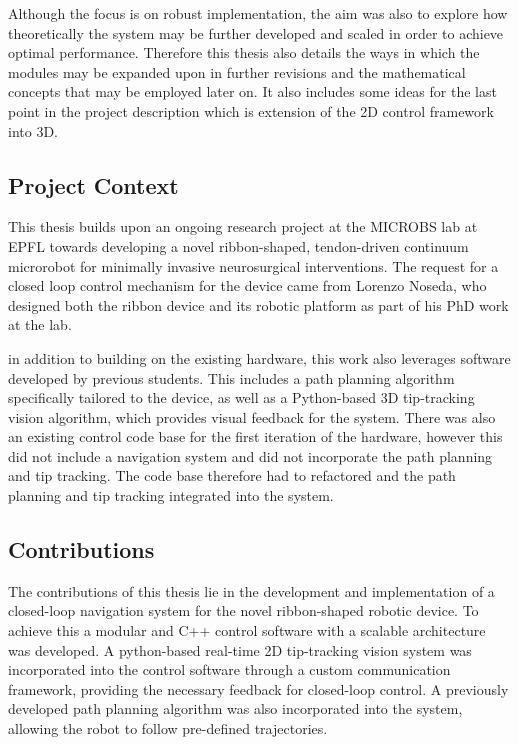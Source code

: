 Although the focus is on robust implementation, the aim was also to explore how theoretically the system may be further developed and scaled in order to achieve optimal performance. Therefore this thesis also details the ways in which the modules may be expanded upon in further revisions and the mathematical concepts that may be employed later on. It also includes some ideas for the last point in the project description which is extension of the 2D control framework into 3D.

\subsection{Project Context}

This thesis builds upon an ongoing research project at the MICROBS lab at EPFL towards developing a novel ribbon-shaped, tendon-driven continuum microrobot for minimally invasive neurosurgical interventions. The request for a closed loop control mechanism for the device came from Lorenzo Noseda, who designed both the ribbon device and its robotic platform as part of his PhD work at the lab. 

in addition to building on the existing hardware, this work also leverages software developed by previous students. This includes a path planning algorithm specifically tailored to the device, as well as a Python-based 3D tip-tracking vision algorithm, which provides visual feedback for the system. There was also an existing control code base for the first iteration of the hardware, however this did not include a navigation system and did not incorporate the path planning and tip tracking. The code base therefore had to refactored and the path planning and tip tracking integrated into the system.


\subsection{Contributions}
The contributions of this thesis lie in the development and implementation of a closed-loop navigation system for the novel ribbon-shaped robotic device. To achieve this a modular and C++ control software with a scalable architecture was developed. A python-based real-time 2D tip-tracking vision system was incorporated into the control software through a custom communication framework, providing the necessary feedback for closed-loop control. A previously developed path planning algorithm was also incorporated into the system, allowing the robot to follow pre-defined trajectories.

